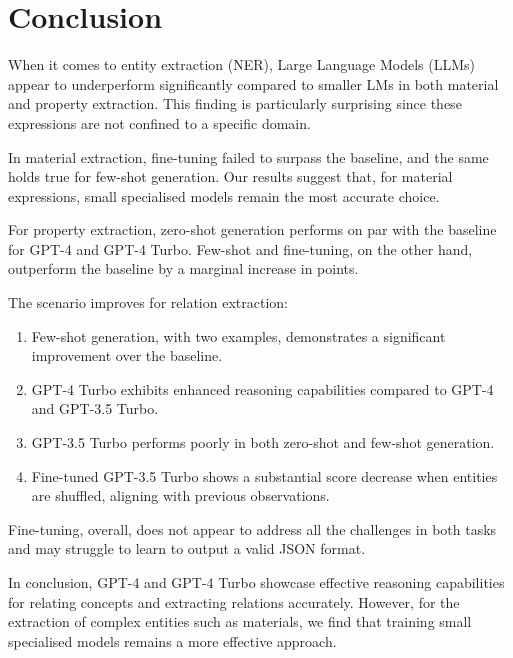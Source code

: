 \documentclass[a4paper]{article}
\begin{document}
\section{Conclusion}

When it comes to entity extraction (NER), Large Language Models (LLMs) appear to underperform significantly compared to smaller LMs in both material and property extraction. This finding is particularly surprising since these expressions are not confined to a specific domain.

In material extraction, fine-tuning failed to surpass the baseline, and the same holds true for few-shot generation. Our results suggest that, for material expressions, small specialised models remain the most accurate choice.

For property extraction, zero-shot generation performs on par with the baseline for GPT-4 and GPT-4 Turbo. Few-shot and fine-tuning, on the other hand, outperform the baseline by a marginal increase in points.

The scenario improves for relation extraction:
\begin{enumerate}
\item Few-shot generation, with two examples, demonstrates a significant improvement over the baseline.
\item GPT-4 Turbo exhibits enhanced reasoning capabilities compared to GPT-4 and GPT-3.5 Turbo.
\item GPT-3.5 Turbo performs poorly in both zero-shot and few-shot generation.
\item Fine-tuned GPT-3.5 Turbo shows a substantial score decrease when entities are shuffled, aligning with previous observations.
\end{enumerate}
    
Fine-tuning, overall, does not appear to address all the challenges in both tasks and may struggle to learn to output a valid JSON format.

In conclusion, GPT-4 and GPT-4 Turbo showcase effective reasoning capabilities for relating concepts and extracting relations accurately. However, for the extraction of complex entities such as materials, we find that training small specialised models remains a more effective approach.





\clearpage

\appendix

\end{document}
